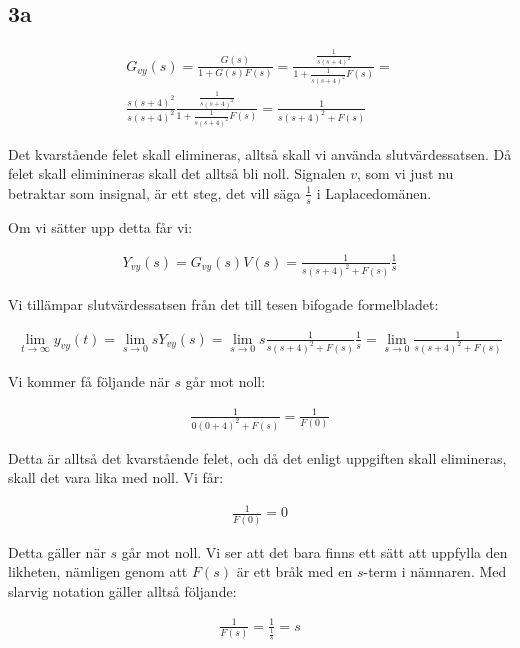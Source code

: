 \documentclass[a4paper]{article}
\begin{document}
\subsection{3a}
\begin{align*}
  G_{vy}(s) = \frac{G(s)}{1 + G(s)F(s)} = \frac{\frac{1}{s(s+4)^2}}{1 + \frac{1}{s(s+4)^2}F(s)} = \\
  \frac{s(s+4)^2}{s(s+4)^2}\frac{\frac{1}{s(s+4)^2}}{1 + \frac{1}{s(s+4)^2}F(s)} = \frac{1}{s(s+4)^2 + F(s)}
\end{align*}

Det kvarstående felet skall elimineras, alltså skall vi använda slutvärdessatsen. Då felet skall eliminineras skall det alltså bli noll. Signalen $v$, som vi just nu betraktar som insignal, är ett steg, det vill säga $\frac{1}{s}$ i Laplacedomänen.

Om vi sätter upp detta får vi:

\begin{align*}
  Y_{vy}(s) = G_{vy}(s) V(s) = \frac{1}{s(s+4)^2 + F(s)} \frac{1}{s}
\end{align*}

Vi tillämpar slutvärdessatsen från det till tesen bifogade formelbladet:

\begin{align*}
  \lim_{t \rightarrow \infty} y_{vy}(t) = \lim_{s \rightarrow 0} sY_{vy}(s) = \lim_{s \rightarrow 0} s \frac{1}{s(s+4)^2 + F(s)} \frac{1}{s} = \lim_{s \rightarrow 0} \frac{1}{s(s+4)^2 + F(s)}
\end{align*}

Vi kommer få följande när $s$ går mot noll:

\begin{align*}
  \frac{1}{0(0+4)^2 + F(s)} = \frac{1}{F(0)}
\end{align*}

Detta är alltså det kvarstående felet, och då det enligt uppgiften skall elimineras, skall det vara lika med noll. Vi får:

\begin{align*}
  \frac{1}{F(0)} = 0
\end{align*}

Detta gäller när $s$ går mot noll. Vi ser att det bara finns ett sätt att uppfylla den likheten, nämligen genom att $F(s)$ är ett bråk med en $s$-term i nämnaren. Med slarvig notation gäller alltså följande:

\begin{align*}
  \frac{1}{F(s)} = \frac{1}{\frac{1}{s}} = s
\end{align*}
\end{document}
